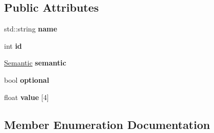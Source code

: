 \subsection*{Public Attributes}
\begin{DoxyCompactItemize}
\item 
std\+::string {\bfseries name}\hypertarget{structTechnique_1_1Pass_1_1ShaderParam_ae6e07404f90a5548f686d41227523519}{}\label{structTechnique_1_1Pass_1_1ShaderParam_ae6e07404f90a5548f686d41227523519}

\item 
int {\bfseries id}\hypertarget{structTechnique_1_1Pass_1_1ShaderParam_ae338c6ade993834b84ab0a3ec05d1006}{}\label{structTechnique_1_1Pass_1_1ShaderParam_ae338c6ade993834b84ab0a3ec05d1006}

\item 
\hyperlink{structTechnique_1_1Pass_1_1ShaderParam_adfc05401be5223ca462814070a09c776}{Semantic} {\bfseries semantic}\hypertarget{structTechnique_1_1Pass_1_1ShaderParam_ab4c09d2d9c3bb3fcf43ec32d50010192}{}\label{structTechnique_1_1Pass_1_1ShaderParam_ab4c09d2d9c3bb3fcf43ec32d50010192}

\item 
bool {\bfseries optional}\hypertarget{structTechnique_1_1Pass_1_1ShaderParam_a86a454382b9a3a8e1ad0b08137a2d24f}{}\label{structTechnique_1_1Pass_1_1ShaderParam_a86a454382b9a3a8e1ad0b08137a2d24f}

\item 
float {\bfseries value} \mbox{[}4\mbox{]}\hypertarget{structTechnique_1_1Pass_1_1ShaderParam_ac79966d07f769a1d9d8a3fdbf254c1c5}{}\label{structTechnique_1_1Pass_1_1ShaderParam_ac79966d07f769a1d9d8a3fdbf254c1c5}

\end{DoxyCompactItemize}


\subsection{Member Enumeration Documentation}
